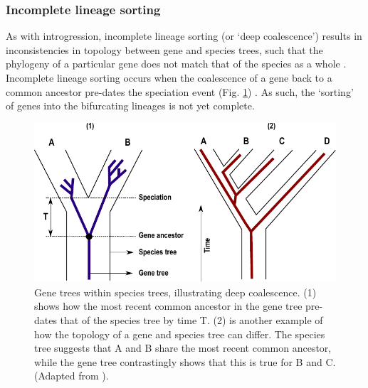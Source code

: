 \subsubsection{Incomplete lineage sorting}
As with introgression, incomplete lineage sorting (or `deep coalescence') results in inconsistencies in topology between gene and species trees, such that the phylogeny of a particular gene does not match that of the species as a whole \citep{Maddison1997, Nichols2001,Funk2003}. Incomplete lineage sorting occurs when the coalescence of a gene back to a common ancestor pre-dates the speciation event (Fig. \ref{fig:gene_tree}) \citep{Maddison1997}. As such, the `sorting' of genes into the bifurcating lineages is not yet complete. 

\begin{figure}[H]
	\centering
	\includegraphics[scale = 1]{Images/gene_trees.pdf}
    \newline
	\caption{Gene trees within species trees, illustrating deep coalescence. (1) shows how the most recent common ancestor in the gene tree pre-dates that of the species tree by time T. (2) is another example of how the topology of a gene and species tree can differ. The species tree suggests that A and B share the most recent common ancestor, while the gene tree contrastingly shows that this is true for B and C. (Adapted from \citet{Maddison1997,Nichols2001,Edwards2009}).}
	\label{fig:gene_tree}
\end{figure}

